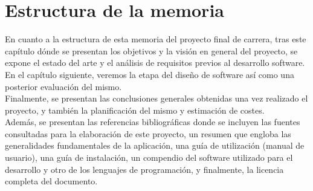 \section{Estructura de la memoria}

En cuanto a la estructura de esta memoria del proyecto final de carrera, tras este capítulo dónde se presentan los objetivos y la visión en general del proyecto, se expone el estado del arte y el análisis de requisitos previos al desarrollo software.\\

En el capítulo siguiente, veremos la etapa del diseño de software así como una posterior evaluación del mismo.\\

Finalmente, se presentan las conclusiones generales obtenidas una vez realizado el proyecto, y también la planificación del mismo y estimación de costes.\\

Además, se presentan las referencias bibliográficas donde se incluyen las fuentes consultadas para la elaboración de este proyecto, un resumen que engloba las generalidades fundamentales de la aplicación, una guía de utilización (manual de usuario), una guía de instalación, un compendio del software utilizado para el desarrollo y otro de los lenguajes de programación, y finalmente, la licencia completa del documento.\\
